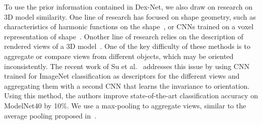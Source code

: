 To use the prior information contained in Dex-Net, we also draw on research on 3D model similarity.
One line of research has focused on shape geometry, such as characteristics of harmonic functions on the shape~\cite{bronstein2011shape}, or CNNs trained on a voxel representation of shape~\cite{maturana2015voxnet, wu20153d}.
Onother line of research relies on the description of rendered views of a 3D model~\cite{chen2003visual, goldfeder2011data}.
One of the key difficulty of these methods is to aggregate or compare views from different objects, which may be oriented inconsistently.
The recent work of Su et al.~\cite{su2015multi} addresses this issue by using CNN trained for ImageNet classification as descriptors for the different views and aggregating them with a second CNN that learns the invariance to orientation.
Using this method, the authors improve state-of-the-art classification accuracy on ModelNet40 by 10\%.
We use a max-pooling to aggregate views, similar to the average pooling proposed in~\cite{aubry2015understanding}.

